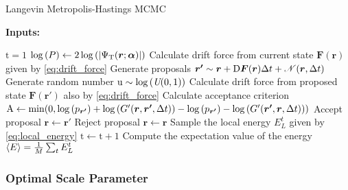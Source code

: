 \begin{algorithm}
\caption{Langevin Metropolis-Hastings MCMC}\label{algo:lmh}
\hspace*{\algorithmicindent} \textbf{Inputs: }
\begin{algorithmic}[1]
\State $\mathrm{t}=1$
\State $\log{\qty(P)}\gets 2\log{\qty(\abs{\Psi_{\mathrm{T}}(\bm{r};\bm{\alpha})})}$ 
\Repeat 
    \State Calculate drift force from current state $\bm{F}(\bm{r})$ given by \autoref{eq:drift_force}
    \State Generate proposals $\bm{r'}\sim\bm{r}+\mathrm{D}\bm{F}(\bm{r})\Delta t + \mathcal{N}\qty(\bm{r},\Delta t)$
    \State Generate random number $\mathrm{u}\sim\log{\qty(\textit{U}(0, 1))}$
    \State Calculate drift force from proposed state $\bm{F}(\bm{r'})$ also by \autoref{eq:drift_force}
    \State Calculate acceptance criterion
    \State $\mathrm{A}\gets\mathrm{min}\qty(0, \log{\qty(p_{\bm{r'}})} + \log{\qty(G'\qty(\bm{r}, \bm{r'}, \Delta t))} - \log{\qty(p_{\bm{r'}})}-\log{\qty(G'\qty(\bm{r'}, \bm{r}, \Delta t))})$
        \State Accept proposal $\bm{r}\gets\bm{r'}$
    \Else
        \State Reject proposal $\bm{r}\gets\bm{r}$
    \EndIf
    \State Sample the local energy $E^t_L$ given by \autoref{eq:local_energy}
    \State $\mathrm{t}\gets\mathrm{t}+1$
\State Compute the expectation value of the energy $\expval{E}=\frac{1}{M}\sum_t E^t_L$
\end{algorithmic}
\end{algorithm}

\subsubsection{Optimal Scale Parameter}\label{sec:tuning}


